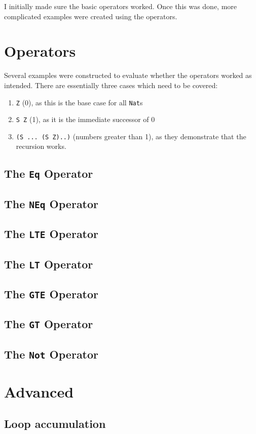 I initially made sure the basic operators worked. Once this was done, more
complicated examples were created using the operators.
\section{Operators}
	Several examples were constructed to evaluate whether the operators worked
	as intended. There are essentially three cases which need to be covered:
	\begin{enumerate}
		\item \texttt{Z} (0), as this is the base case for all \texttt{Nat}s
		\item \texttt{S Z} (1), as it is the immediate successor of 0
		\item \texttt{(S ... (S Z)..)} (numbers greater than 1), as they
			  demonstrate that the recursion works.
	\end{enumerate}
    \subsection{The \texttt{Eq} Operator}
    
    \subsection{The \texttt{NEq} Operator}
    
    \subsection{The \texttt{LTE} Operator}
    
    \subsection{The \texttt{LT} Operator}
    
    \subsection{The \texttt{GTE} Operator}
    
    \subsection{The \texttt{GT} Operator}
    
    \subsection{The \texttt{Not} Operator}

\section{Advanced}
    \subsection{Loop accumulation}
